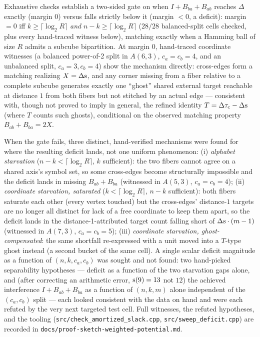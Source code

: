 Exhaustive checks establish a two-sided gate on when $I+B_{ba}+B_{ab}$
reaches $\Delta$ exactly (margin $0$) versus falls strictly below it
(margin $<0$, a deficit): margin $=0$ iff $k\ge\lceil\log_2R\rceil$
\emph{and} $n-k\ge\lceil\log_2R\rceil$ ($28/28$ balanced-split cells
checked, plus every hand-traced witness below), matching exactly when
a Hamming ball of size $R$ admits a subcube bipartition. At margin
$0$, hand-traced coordinate witnesses (a balanced power-of-2 split in
$A(6,3)$, $c_a=c_b=4$, and an unbalanced split, $c_a=3,c_b=4$) show
the mechanism directly: cross-edges form a matching realizing
$X=\Delta\mathrm{s}$, and any corner missing from a fiber relative to a
complete subcube generates exactly one ``ghost'' shared external
target reachable at distance $1$ from both fibers but not stitched by
an actual edge --- consistent with, though not proved to imply in
general, the refined identity $T=\Delta\tau_{\mathrm{c}}-\Delta\mathrm{s}$ (where $T$
counts such ghosts), conditional on the observed matching property
$B_{ab}+B_{ba}=2X$.

When the gate fails, three distinct, hand-verified mechanisms were
found for where the resulting deficit lands, not one uniform
phenomenon: (i) \emph{alphabet starvation} ($n-k<\lceil\log_2R\rceil$,
$k$ sufficient): the two fibers cannot agree on a shared axis's
symbol set, so some cross-edges become structurally impossible and the
deficit lands in missing $B_{ab}+B_{ba}$ (witnessed in $A(5,3)$,
$c_a=c_b=4$); (ii) \emph{coordinate starvation, saturated}
($k<\lceil\log_2R\rceil$, $n-k$ sufficient): both fibers saturate each
other (every vertex touched) but the cross-edges' distance-$1$ targets
are no longer all distinct for lack of a free coordinate to keep them
apart, so the deficit lands in the distance-1-attributed target count
falling short of $\Delta\mathrm{s}\cdot(m-1)$ (witnessed in $A(7,3)$,
$c_a=c_b=5$); (iii) \emph{coordinate starvation, ghost-compensated}:
the same shortfall re-expressed with a unit moved into a $T$-type
ghost instead (a second bucket of the same cell). A single scalar
deficit magnitude as a function of $(n,k,c_a,c_b)$ was sought and not
found: two hand-picked separability hypotheses --- deficit as a
function of the two starvation gaps alone, and (after correcting an
arithmetic error, $\mathrm{s}(9)=13$ not $12$) the achieved interference
$I+B_{ab}+B_{ba}$ as a function of $(n,k,m)$ alone independent of the
$(c_a,c_b)$ split --- each looked consistent with the data on hand and
were each refuted by the very next targeted test cell. Full witnesses,
the refuted hypotheses, and the tooling
(\texttt{src/check\_amortized\_slack.cpp},
\texttt{src/sweep\_deficit.cpp}) are recorded in
\texttt{docs/proof-sketch-weighted-potential.md}.

